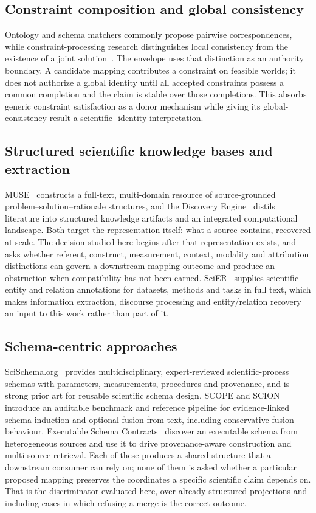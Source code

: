 \subsection{Constraint composition and global consistency}

Ontology and schema matchers commonly propose pairwise correspondences, while
constraint-processing research distinguishes local consistency from the
existence of a joint solution~\cite{dechter2003constraint}. The envelope uses
that distinction as an authority boundary. A candidate mapping contributes a
constraint on feasible worlds; it does not authorize a global identity until
all accepted constraints possess a common completion and the claim is stable
over those completions. This absorbs generic constraint satisfaction as a
donor mechanism while giving its global-consistency result a scientific-
identity interpretation.

\subsection{Structured scientific knowledge bases and extraction}

MUSE~\cite{muse2026} constructs a full-text, multi-domain resource of
source-grounded problem--solution--rationale structures, and the Discovery
Engine~\cite{discoveryEngine2025} distils literature into structured knowledge
artifacts and an integrated computational landscape. Both target the
representation itself: what a source contains, recovered at scale. The
decision studied here begins after that representation exists, and asks
whether referent, construct, measurement, context, modality and attribution
distinctions can govern a downstream mapping outcome and produce an
obstruction when compatibility has not been earned. SciER~\cite{scier2024}
supplies scientific entity and relation annotations for datasets, methods and
tasks in full text, which makes information extraction, discourse processing
and entity/relation recovery an input to this work rather than part of it.

\subsection{Schema-centric approaches}

SciSchema.org~\cite{scischema2026} provides multidisciplinary,
expert-reviewed scientific-process schemas with parameters, measurements,
procedures and provenance, and is strong prior art for reusable scientific
schema design. SCOPE and SCION~\cite{scopes2026} introduce an auditable
benchmark and reference pipeline for evidence-linked schema induction and
optional fusion from text, including conservative fusion behaviour. Executable
Schema Contracts~\cite{schemaContracts2026} discover an executable schema from
heterogeneous sources and use it to drive provenance-aware construction and
multi-source retrieval. Each of these produces a shared structure that a
downstream consumer can rely on; none of them is asked whether a particular
proposed mapping preserves the coordinates a specific scientific claim depends
on. That is the discriminator evaluated here, over already-structured
projections and including cases in which refusing a merge is the correct
outcome.

